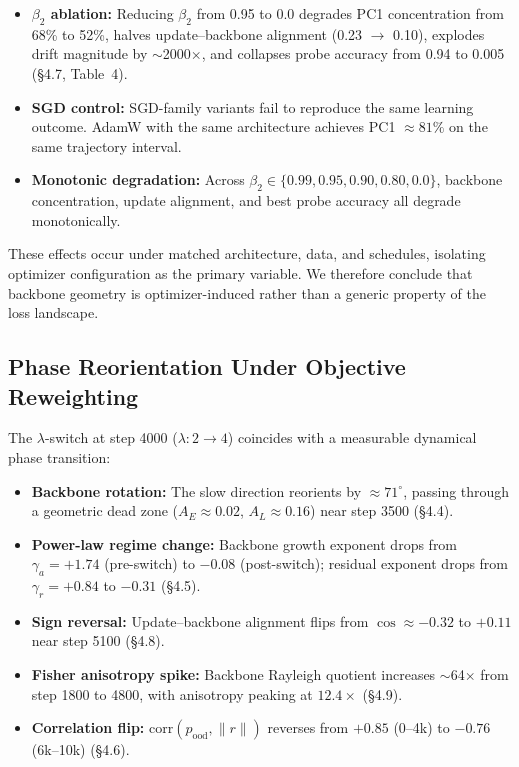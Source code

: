 \documentclass[11pt,a4paper]{article}
\begin{document}
\begin{itemize}
\item \textbf{$\beta_2$ ablation:} Reducing $\beta_2$ from 0.95 to 0.0 degrades PC1 concentration from 68\% to 52\%, halves update--backbone alignment (0.23 $\to$ 0.10), explodes drift magnitude by $\sim$2000$\times$, and collapses probe accuracy from 0.94 to 0.005 (\S4.7, Table~4).
\item \textbf{SGD control:} SGD-family variants fail to reproduce the same learning outcome. AdamW with the same architecture achieves PC1 $\approx 81\%$ on the same trajectory interval.
\item \textbf{Monotonic degradation:} Across $\beta_2 \in \{0.99, 0.95, 0.90, 0.80, 0.0\}$, backbone concentration, update alignment, and best probe accuracy all degrade monotonically.
\end{itemize}

These effects occur under matched architecture, data, and schedules, isolating optimizer configuration as the primary variable. We therefore conclude that backbone geometry is optimizer-induced rather than a generic property of the loss landscape.


\subsection{Phase Reorientation Under Objective Reweighting}

The $\lambda$-switch at step 4000 ($\lambda: 2 \to 4$) coincides with a measurable dynamical phase transition:

\begin{itemize}
\item \textbf{Backbone rotation:} The slow direction reorients by $\approx 71^{\circ}$, passing through a geometric dead zone ($A_E \approx 0.02$, $A_L \approx 0.16$) near step 3500 (\S4.4).
\item \textbf{Power-law regime change:} Backbone growth exponent drops from $\gamma_a = +1.74$ (pre-switch) to $-0.08$ (post-switch); residual exponent drops from $\gamma_r = +0.84$ to $-0.31$ (\S4.5).
\item \textbf{Sign reversal:} Update--backbone alignment flips from $\cos \approx -0.32$ to $+0.11$ near step 5100 (\S4.8).
\item \textbf{Fisher anisotropy spike:} Backbone Rayleigh quotient increases $\sim$64$\times$ from step 1800 to 4800, with anisotropy peaking at $12.4\times$ (\S4.9).
\item \textbf{Correlation flip:} $\mathrm{corr}(p_{\mathrm{ood}}, \|r\|)$ reverses from $+0.85$ (0--4k) to $-0.76$ (6k--10k) (\S4.6).
\end{itemize}
\end{document}
